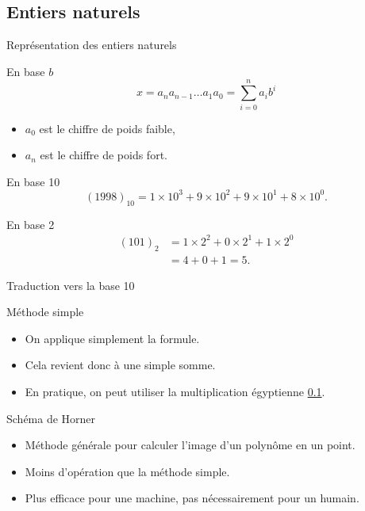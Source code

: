 \subsection{Entiers naturels}

\begin{frame}{Représentation des entiers naturels}                                                                                                                
 \begin{block}{En base $b$}
 \[
  x = a_n a_{n-1} \ldots a_1 a_0  = \sum_{i=0}^n a_i b^i
  \]
  \begin{itemize}
  \item $a_0$ est le chiffre de poids faible,
  \item $a_n$ est le chiffre de poids fort.
  \end{itemize}
\end{block}
\begin{exampleblock}{En base 10}
    \[
      (1998)_{10} = 1 \times 10^3 + 9 \times 10^2 + 9 \times 10^1 + 8 \times 10^0 .
    \]
\end{exampleblock}

\begin{exampleblock}{En base 2}
  \begin{align*}
    (101)_2 & = 1 \times 2^2 + 0 \times 2^1 + 1 \times 2^0 \\
            &= 4 + 0 + 1 = 5.
  \end{align*}
          
\end{exampleblock}
\end{frame}

\begin{frame}{Traduction vers la base 10}
  \begin{block}{Méthode simple}
    \begin{itemize}
    \item On applique simplement la formule.
    \item Cela revient donc à une simple somme.
    \item En pratique, on peut utiliser la multiplication égyptienne \ref{}.
    \end{itemize}
  \end{block}

  \begin{block}{Schéma de Horner}
    \begin{itemize}
    \item Méthode générale pour calculer l'image d'un polynôme en un point.
    \item Moins d'opération que la méthode simple.
    \item Plus efficace pour une machine, pas nécessairement pour un humain.
    \end{itemize}

  \end{block}
\end{frame}


